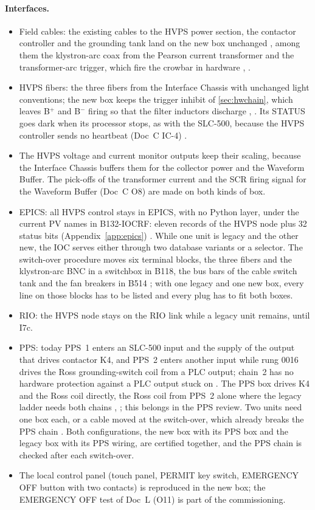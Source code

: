 \paragraph{Interfaces.}
\begin{itemize}
\item Field cables: the existing cables to the HVPS power section, the contactor
controller and the grounding tank land on the new box unchanged , among them the
klystron-arc coax from the Pearson current transformer and the transformer-arc
trigger, which fire the crowbar in hardware , .
\item HVPS fibers: the three fibers from the Interface Chassis with unchanged light
conventions; the new box keeps the trigger inhibit of \cref{sec:hwchain}, which leaves
B$^+$ and B$^-$ firing so that the filter inductors discharge , . Its
STATUS goes dark when its processor stops, as with the SLC-500, because the HVPS
controller sends no heartbeat (Doc~C IC-4) .
\item The HVPS voltage and current monitor outputs keep their scaling, because the
Interface Chassis buffers them for the collector power and the Waveform Buffer. The
pick-offs of the transformer current and the SCR firing signal for the Waveform
Buffer (Doc~C O8) are made on both kinds of box.
\item EPICS: all HVPS control stays in EPICS, with no Python layer, under the current
PV names in \mbox{B132-IOCRF}: eleven records of the HVPS node plus 32 status bits
(Appendix~\ref*{app:epics}) . While one unit is legacy and the other new, the IOC
serves either through two database variants or a selector. The switch-over procedure
moves six terminal blocks, the three fibers and the klystron-arc BNC in a switchbox
in B118, the bus bars of the cable switch tank and the fan breakers in B514 ;
with one legacy and one new box, every line on those blocks has to be listed and every
plug has to fit both boxes.
\item RIO: the HVPS node stays on the RIO link while a legacy unit remains, until I7c.
\item PPS: today PPS~1 enters an SLC-500 input and the supply of the output that drives
contactor K4, and PPS~2 enters another input while rung 0016 drives the Ross
grounding-switch coil from a PLC output; chain~2 has no hardware protection against a
PLC output stuck on . The PPS box drives K4 and the Ross coil directly, the
Ross coil from PPS~2 alone where the legacy ladder needs both chains , ; this
belongs in the PPS review. Two units need one box each, or a cable moved at the
switch-over, which already breaks the PPS chain . Both configurations, the new
box with its PPS box and the legacy box with its PPS wiring, are certified together,
and the PPS chain is checked after each switch-over.
\item The local control panel (touch panel, PERMIT key switch, EMERGENCY OFF button
with two contacts) is reproduced in the new box; the EMERGENCY OFF test of Doc~L (O11)
is part of the commissioning.
\end{itemize}

